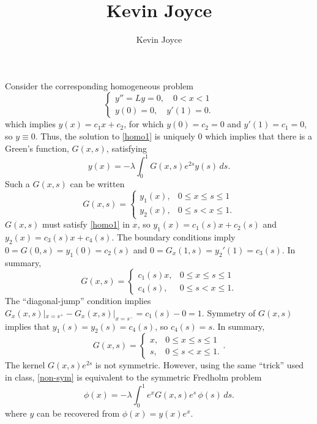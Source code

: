 \documentclass{homework}
\title{Kevin Joyce}
\author{Kevin Joyce}
\begin{document}
 
\newcommand{\figref}[1]{\figurename~\ref{#1}}
\renewcommand{\bar}{\overline}
\renewcommand{\hat}{\widehat}
\renewcommand{\SS}{\mathcal S}
\renewcommand{\NN}{\mathcal N}
\newcommand{\DD}{\mathcal D}
\newcommand{\eps}{\varepsilon}
\newcommand{\del}{\partial}


\begin{solution}
Consider the corresponding homogeneous problem
\begin{equation}
  \begin{cases}
    y'' = Ly = 0,\quad0<x<1\\
    y(0) = 0,\quad y'(1)=0.
  \end{cases} \label{homo1}
\end{equation}
which implies $y(x) = c_1 x + c_2$, for which $y(0) = c_2 = 0$ and $y'(1) = c_1 = 0$, so $y\equiv 0$. Thus, the solution to \eqref{homo1} is uniquely $0$ which implies that there is a Green's function, $G(x,s)$, satisfying
\begin{equation}
  y(x) = -\lambda \int_0^1 G(x,s) e^{2s}y(s)\,ds. \label{non-sym}
\end{equation}
Such a $G(x,s)$ can be written
$$
G(x,s) = \begin{cases}
  y_1(x),& 0\le x\le s \le 1\\
  y_2(x),& 0\le s< x \le 1.
\end{cases}
$$
$G(x,s)$ must satisfy \eqref{homo1} in $x$, so $y_1(x) = c_1(s) x + c_2(s)$ and $y_2(x) = c_3(s) x + c_4(s)$.  The boundary conditions imply $0=G(0,s) = y_1(0) = c_2(s)$ and $0=G_x(1,s) = y_2'(1) = c_3(s)$. In summary,
$$
G(x,s) = \begin{cases}
  c_1(s) x,& 0\le x\le s \le 1\\
  c_4(s),& 0\le s< x \le 1.
\end{cases}
$$
The ``diagonal-jump'' condition implies $G_x(x,s)|_{x=s^+} - G_x(x,s)|_{x=s^-} = c_1(s) - 0 = 1$. Symmetry of $G(x,s)$ implies that $y_1(s) = y_2(s) = c_4(s)$, so $c_4(s) = s$. In summary,
$$
G(x,s) = \begin{cases}
  x,& 0\le x\le s \le 1\\
  s,& 0\le s< x \le 1.
\end{cases}.
$$
The kernel $G(x,s)e^{2s}$ is not symmetric. However, using the same ``trick'' used  in class, \eqref{non-sym} is equivalent to the symmetric Fredholm problem
$$
  \phi(x) = -\lambda \int_0^1 e^x G(x,s) e^{s} \,\phi(s)\,ds. 
$$
where $y$ can be recovered from $\phi(x) = y(x) e^x$.

\end{solution}
\end{document}
